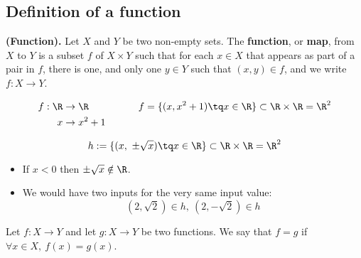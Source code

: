\subsection{Definition of a function}
\begin{definition}
    \textbf{(Function).} Let $X$ and $Y$ be two non-empty sets. The \textbf{function}, or \textbf{map}, from $X$ to $Y$ is a subset $f$ of $X\times Y$ such that for each $x\in X$ that appears as part of a pair in $f$, there is one, and only one $y\in Y$ such that $\left( x, y \right)\in f$, and we write $f:X\to Y$.
\end{definition}
\begin{example}
    \begin{align}
        f:\R&\to\R \quad\quad\quad\quad\quad f = \{( x, x^2 + 1)\tq x\in\R \}\subset\R\times\R = \R^2 \\ 
        x&\to x^2 + 1
    \end{align}
\end{example}
\begin{example}
    \begin{equation}
        h:=\{( x,\ \pm \sqrt{x})\tq x\in\R \}\subset\R\times\R = \R^2 
    \end{equation}
    \begin{itemize}
        \item If $x < 0$ then $\pm\sqrt{x} \notin\R $.
        \item We would have two inputs for the very same input value: 
            \begin{equation}
                (2, \sqrt{2} )\in h,\ ( 2, -\sqrt{2})\in h
            \end{equation}
    \end{itemize}
\end{example}
\begin{definition}
    Let $f:X\to Y$ and let $g:X\to Y$ be two functions. We say that $f = g$ if $\forall x\in X,\ f\left( x \right) = g\left( x \right)$.
\end{definition}

